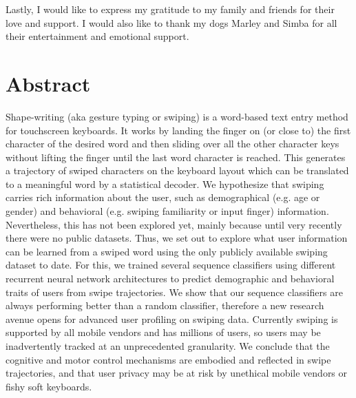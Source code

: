 \documentclass[11pt,oneside,a4paper,openright]{book}
\begin{document}
Lastly, I would like to express my gratitude to my family and friends for their love and support. I would also like to thank my dogs Marley and Simba for all their entertainment and emotional support.
\newpage


\chapter*{Abstract}


Shape-writing (aka gesture typing or swiping) is a word-based text entry method for touchscreen keyboards.
It works by landing the finger on (or close to) the first character of the desired word
and then sliding over all the other character keys without lifting the finger until the last word character is reached.
This generates a trajectory of swiped characters on the keyboard layout
which can be translated to a meaningful word by a statistical decoder.
%
We hypothesize that swiping carries rich information about the user,
such as demographical (e.g. age or gender) and behavioral (e.g. swiping familiarity or input finger) information.
Nevertheless, this has not been explored yet, mainly because until very recently there were no public datasets.
Thus, we set out to explore what user information can be learned from a swiped word
using the only publicly available swiping dataset to date.
For this, we trained several sequence classifiers using different recurrent neural network architectures
to predict demographic and behavioral traits of users from swipe trajectories.
%
We show that our sequence classifiers are always performing better than a random classifier,
therefore a new research avenue opens for advanced user profiling on swiping data.
%
Currently swiping is supported by all mobile vendors and has millions of users,
so users may be inadvertently tracked at an unprecedented granularity.
%
We conclude that the cognitive and motor control mechanisms are embodied and reflected in swipe trajectories,
and that user privacy may be at risk by unethical mobile vendors or fishy soft keyboards.
\end{document}
